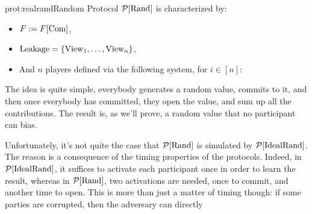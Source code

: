\begin{protocol}{prot:realrand}{Random Protocol}
$\mathcal{P}[\text{Rand}]$ is characterized by:
\begin{itemize}
    \item $F := F[\text{Com}]$,
    \item $\text{Leakage} = \{\text{View}_1, \ldots, \text{View}_n\}$,
    \item And $n$ players defined via the following system, for $i \in [n]$:
\end{itemize}
\end{protocol}

The idea is quite simple, everybody generates a random value,
commits to it, and then once everybody has committed, they open the value,
and sum up all the contributions.
The result is, as we'll prove, a random value that no participant
can bias.

Unfortunately, it's not quite the case that $\mathcal{P}[\text{Rand}]$
is simulated by $\mathcal{P}[\text{IdealRand}]$.
The reason is a consequence of the timing properties
of the protocols.
Indeed, in $\mathcal{P}[\text{IdealRand}]$, it suffices to activate
each participant once in order to learn the result,
whereas in $\mathcal{P}[\text{Rand}]$, two activations are needed,
once to commit, and another time to open.
This is more than just a matter of timing though:
if some parties are corrupted, then the adversary can directly
